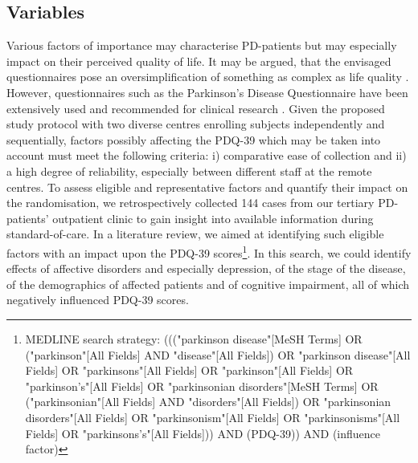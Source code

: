\documentclass[number,12pt,review]{elsarticle}
\begin{document}
\subsection{Variables}
\label{varsec}

Various factors of importance may characterise \ac{PD}-patients but may especially impact on their perceived quality of life. It may be argued, that the envisaged questionnaires pose an oversimplification of something as complex as life quality \citep{martinez1998introduction}. However, questionnaires such as the Parkinson's Disease Questionnaire have been extensively used and recommended for clinical research \citep{marinus2002health}. Given the proposed study protocol with two diverse centres enrolling subjects independently and sequentially, factors possibly affecting the \ac{PDQ-39} which may be taken into account must meet the following criteria: i) comparative ease of collection and ii) a high degree of reliability, especially between different staff at the remote centres. To assess eligible and representative factors and quantify their impact on the randomisation, we retrospectively collected 144 cases from our tertiary \ac{PD}-patients' outpatient clinic to gain insight into available information during standard-of-care. 
In a literature review, we aimed at identifying such eligible factors with an impact upon the \ac{PDQ-39} scores\footnote{MEDLINE search strategy: ((("parkinson disease"[MeSH Terms] OR ("parkinson"[All Fields] AND "disease"[All Fields]) OR "parkinson disease"[All Fields] OR "parkinsons"[All Fields] OR "parkinson"[All Fields] OR "parkinson's"[All Fields] OR "parkinsonian disorders"[MeSH Terms] OR ("parkinsonian"[All Fields] AND "disorders"[All Fields]) OR "parkinsonian disorders"[All Fields] OR "parkinsonism"[All Fields] OR "parkinsonisms"[All Fields] OR "parkinsons's"[All Fields])) AND (PDQ-39)) AND (influence factor)}. In this search, we could identify effects of affective disorders and especially depression\citep{Rosinczuk2017-rn, Wiesli2017-eq}, of the stage of the disease, of the demographics of affected patients \citep{Wu2014-pk} and of cognitive impairment, all of which negatively influenced \ac{PDQ-39} scores. 
\end{document}
